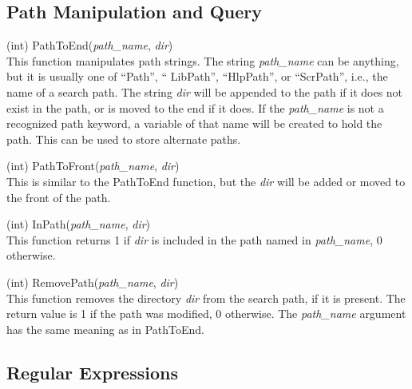 \subsection{Path Manipulation and Query}

\begin{description}
\item{(int) \vt PathToEnd({\it path\_name}, {\it dir\/})}\\
This function manipulates path strings.  The string {\it path\_name}
can be anything, but it is usually one of ``{\vt Path}'', ``{\vt
LibPath}'', ``{\vt HlpPath}'', or ``{\vt ScrPath}'', i.e., the name of
a search path.  The string {\it dir\/} will be appended to the path if
it does not exist in the path, or is moved to the end if it does.  If
the {\it path\_name} is not a recognized path keyword, a variable of
that name will be created to hold the path.  This can be used to store
alternate paths.

\item{(int) \vt PathToFront({\it path\_name\/}, {\it dir\/})}\\
This is similar to the {\vt PathToEnd} function, but the {\it dir\/}
will be added or moved to the front of the path.

\item{(int) \vt InPath({\it path\_name\/}, {\it dir\/})}\\
This function returns 1 if {\it dir\/} is included in the path named in
{\it path\_name}, 0 otherwise.

\item{(int) \vt RemovePath({\it path\_name\/}, {\it dir\/})}\\
This function removes the directory {\it dir} from the search path, if
it is present.  The return value is 1 if the path was modified, 0
otherwise.  The {\it path\_name} argument has the same meaning as in
{\vt PathToEnd}.

\end{description}


\subsection{Regular Expressions}


